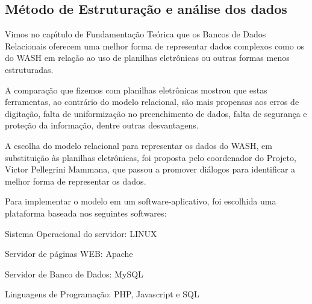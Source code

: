\documentclass[
12pt,		%
openright,	%
twoside,  %
a4paper,			%
chapter=TITLE,		%
english,			%
french,				%
spanish,			%
brazil				%
]{USPSC-classe/USPSC}
\begin{document}
\subsection[M\'etodo de Estrutura\c{c}\~ao e an\'alise dos dados]{M\'etodo de Estrutura\c{c}\~ao e an\'alise dos dados}\label{M\'etodo de Estrutura\c{c}\~ao e an\'alise dos dados}
Vimos no cap\'{\i}tulo de Fundamenta\c{c}\~ao Te\'orica que os Bancos de Dados Relacionais oferecem uma melhor forma de representar dados complexos como os do WASH em rela\c{c}\~ao ao uso de planilhas eletr\^onicas ou outras formas menos estruturadas.









A compara\c{c}\~ao que fizemos com planilhas eletr\^onicas mostrou que estas ferramentas, ao contr\'ario do modelo relacional, s\~ao mais propensas aos erros de digita\c{c}\~ao, falta de uniformiza\c{c}\~ao no preenchimento de dados, falta de seguran\c{c}a e prote\c{c}\~ao da informa\c{c}\~ao, dentre outras desvantagens.









A escolha do modelo relacional para representar os dados do WASH, em substitui\c{c}\~ao \`as planilhas eletr\^onicas, foi proposta pelo coordenador do Projeto, Victor Pellegrini Mammana, que passou a promover di\'alogos para identificar a melhor forma de representar os dados.









Para implementar o modelo em um software-aplicativo, foi escolhida uma plataforma baseada nos seguintes softwares:










\begin{alineas}
\item Sistema Operacional do servidor: LINUX
\item Servidor de p\'aginas WEB: Apache
\item Servidor de Banco de Dados: MySQL
\item Linguagens de Programa\c{c}\~ao: PHP, Javascript e SQL
\end{alineas}
\end{document}
